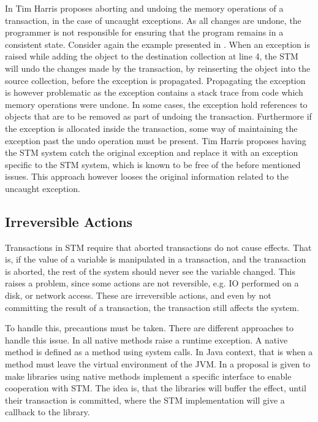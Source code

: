 In \cite{harris2005exceptions} Tim Harris proposes aborting and undoing the memory operations of a transaction, in the case of uncaught exceptions. As all changes are undone, the programmer is not responsible for ensuring that the program remains in a consistent state\cite[p.3]{harris2005exceptions}\cite[p. 80]{harris2010transactional}. Consider again the example presented in . When an exception is raised while adding the object to the destination collection at line 4, the \ac{STM} will undo the changes made by the transaction, by reinserting the object into the source collection, before the exception is propagated. Propagating the exception is however problematic as the exception contains a stack trace from code which memory operations were undone. In some cases, the exception hold references to objects that are to be removed as part of undoing the transaction. Furthermore if the exception is allocated inside the transaction, some way of maintaining the exception past the undo operation must be present. Tim Harris proposes having the \ac{STM} system catch the original exception and replace it with an exception specific to the \ac{STM} system, which is known to be free of the before mentioned issues\cite[p. 3]{harris2005exceptions}. This approach however looses the original information related to the uncaught exception.

\subsection{Irreversible Actions}
\label{subsec:stm_irreversible_actions}
Transactions in \ac{STM} require that aborted transactions do not cause effects. That is, if the value of a variable is manipulated in a transaction, and the transaction is aborted, the rest of the system should never see the variable changed. This raises a problem, since some actions are not reversible, e.g. \ac{IO} performed on a disk, or network access. These are irreversible actions, and even by not committing the result of a transaction, the transaction still affects the system. 

To handle this, precautions must be taken. There are different approaches to handle this issue. In \cite[p. 4]{harris2003language} all native methods raise a runtime exception. A native method is defined as a method using system calls. In Java context, that is when a method must leave the virtual environment of the \ac{JVM}. In \cite{harris2005exceptions} a proposal is given to make libraries using native methods implement a specific interface to enable cooperation with \ac{STM}. The idea is, that the libraries will buffer the effect, until their transaction is committed, where the \ac{STM} implementation will give a callback to the library.

